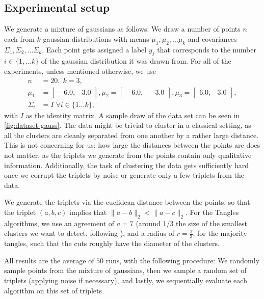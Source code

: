 \subsection{Experimental setup}
We generate a mixture of gaussians as follows: We draw a number of points $n$ each from $k$ gaussian distributions with means $\mu_1, \mu_2, \ldots \mu_k$ and 
covariances $\Sigma_1, \Sigma_2, \ldots \Sigma_k$. Each point gets assigned a label $y_j$ that corresponds to the number $i \in \{1, \ldots k\}$ of the gaussian distribution it was drawn from.
For all of the experiments, unless mentioned otherwise, we use 
\begin{align*}
    n&=20,\; k=3, \\
    \mu_1 &= \begin{bmatrix} -6.0, & 3.0 \end{bmatrix}, \mu_2 = \begin{bmatrix} -6.0, & -3.0 \end{bmatrix},  \mu_3 = \begin{bmatrix} 6.0, & 3.0 \end{bmatrix}, \\
    \Sigma_i &= I \;\forall i \in \{ 1\ldots k\},
\end{align*}
with $I$ as the identity matrix. A sample draw of the data set can be seen in \autoref{fig:dataset-gauss}. The data might be trivial to cluster in a classical setting, as all the 
clusters are cleanly separated from one another by a rather large distance. This is not concerning for us: how large the distances between the points are does not matter, as 
the triplets we generate from the points contain only qualitative information. Additionally, the task of clustering the data gets sufficiently hard once we corrupt the triplets 
by noise or generate only a few triplets from the data.

We generate the triplets via the euclidean distance between the points, so that
the triplet $(a,b,c)$ implies that $\|a - b\|_2 < \|a - c\|_2$. For the Tangles algorithms, we use an agreement of $a=7$ (around 1/3 the size of the smallest
clusters we want to detect, following \cite{klepperClusteringTanglesAlgorithmic2021}), and a radius of $r=\frac{1}{3}$, for the majority
tangles, such that the cuts roughly have the diameter of the clusters.

All results are the average of $50$ runs, with the following procedure: We randomly sample points from the mixture of gaussians, then we sample a random set of triplets
(applying noise if necessary), and lastly, we sequentially evaluate each algorithm on this set of triplets. 

